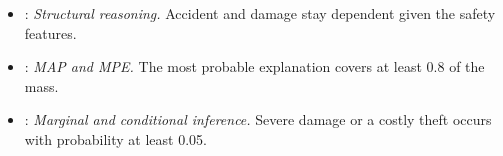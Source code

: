 \begingroup\raggedright
\begin{itemize}[nosep,leftmargin=*]
\item {}: \emph{Structural reasoning.}  Accident and damage stay dependent given the safety features.
\item {}: \emph{MAP and MPE.}  The most probable explanation covers at least 0.8 of the mass.
\item {}: \emph{Marginal and conditional inference.}  Severe damage or a costly theft occurs with probability at least 0.05.
\end{itemize}
\endgroup
